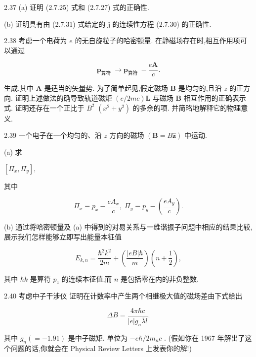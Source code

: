 2.37 (a) 证明 (2.7.25) 式和 (2.7.27) 式的正确性.

(b) 证明具有由 (2.7.31) 式给定的 $\mathbf{j}$ 的连续性方程 (2.7.30) 的正确性.

2.38 考虑一个电荷为 $e$ 的无自旋粒子的哈密顿量. 在静磁场存在时,相互作用项可以通过

$$
{\mathbf{p}}_{\text{算符 }} \rightarrow {\mathbf{p}}_{\text{算符 }} - \frac{e\mathbf{A}}{c}.
$$

生成,其中 $\mathbf{A}$ 是适当的矢量势. 为了简单起见,假定磁场 $\mathbf{B}$ 是均匀的,且沿 $z$ 的正方向. 证明上述做法的确导致轨道磁矩 $\left( {e/{2mc}}\right) \mathbf{L}$ 与磁场 $\mathbf{B}$ 相互作用的正确表示式. 证明还存在一个正比于 ${B}^{2}$ $\left( {{x}^{2} + {y}^{2}}\right)$ 的多余的项. 并简略地解释它的物理意义.

2.39 一个电子在一个均匀的、沿 $z$ 方向的磁场 $\left( {\mathbf{B} = B\widehat{\mathbf{z}}}\right)$ 中运动.

(a) 求

$\left\lbrack {{\Pi }_{x},{\Pi }_{y}}\right\rbrack ,$

其中

$$
{\Pi }_{x} \equiv {p}_{x} - \frac{e{A}_{x}}{c},\;{\Pi }_{y} \equiv {p}_{y} - \left( \frac{e{A}_{y}}{c}\right) .
$$

(b) 通过将哈密顿量及 (a) 中得到的对易关系与一维谐振子问题中相应的结果比较, 展示我们怎样能够立即写出能量本征值

$$
{E}_{k, n} = \frac{{\hbar }^{2}{k}^{2}}{2m} + \left( \frac{\left| {eB}\right| \hbar }{m}\right) \left( {n + \frac{1}{2}}\right) ,
$$

其中 $\hbar k$ 是算符 ${p}_{z}$ 的连续本征值,而 $n$ 是包括零在内的非负整数.

2.40 考虑中子干涉仪
证明在计数率中产生两个相继极大值的磁场差由下式给出

$$
{\Delta B} = \frac{{4\pi }\hbar c}{\left| e\right| {g}_{n}\bar{\lambda }l}.
$$

其中 ${g}_{n}\left( { = - {1.91}}\right)$ 是中子磁矩. 单位为 $- e\hbar /2{m}_{n}c$ . (假如你在 1967 年解出了这个问题的话,你就会在 Physical Review Letters 上发表你的解!)



	
	
	
	
	
\ifx\allfiles\undefined

	\else
	\fi
